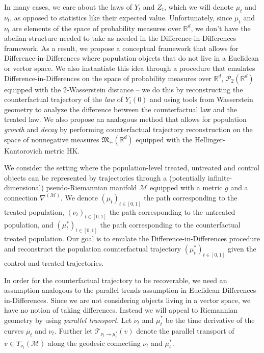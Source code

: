 \documentclass[11pt]{article}
\newcommand{\man}{\mathcal{M}}
\begin{document}
In many cases, we care about the laws of $Y_t$ and $Z_t$, which we will denote $\mu_t$ and $\nu_t$, as opposed to statistics like their expected value. Unfortunately, since $\mu_t$ and $\nu_t$ are elements of the space of probability measures over $\mathbb{R}^d$, we don't have the abelian structure needed to take  as needed in the Difference-in-Differences framework. As a result, we propose a conceptual framework that allows for Difference-in-Differences where population objects that do not live in a Euclidean or vector space. We also instantiate this idea through a procedure that emulates Difference-in-Differences on the space of probability measures over $\mathbb{R}^d$, $\mathcal{P}_2(\mathbb{R}^d)$ equipped with the 2-Wasserstein distance -- we do this by reconstructing the counterfactual trajectory of the \textit{law} of $Y_i(0)$ and using tools from Wasserstein geometry to analyze the difference between the counterfactual law and the treated law. We also propose an analogous method that allows for population \textit{growth} and \textit{decay} by performing counterfactual trajectory reconstruction on the space of nonnegative measures $\mathfrak{M}_+(\mathbb{R}^d)$ equipped with the Hellinger-Kantorovich metric HK. 

We consider the setting where the population-level treated, untreated and control objects can be represented by trajectories through a (potentially infinite-dimensional) pseudo-Riemannian manifold $\man$ equipped with a metric $g$ and a connection $\nabla^{(\man)}$. We denote $(\mu_t)_{t \in [0,1]}$ the path corresponding to the treated population, $(\nu_t)_{t\in [0,1]}$ the path corresponding to the untreated population, and $(\mu_t^*)_{t \in [0,1]}$ the path corresponding to the counterfactual treated population. Our goal is to emulate the Difference-in-Differences procedure and reconstruct the population counterfactual trajectory $(\mu_t^*)_{t \in [0,1]}$ given the control and treated trajectories. 

In order for the counterfactual trajectory to be recoverable, we need an assumption analogous to the parallel trends assumption in Euclidean Differences-in-Differences. Since we are not considering objects living in a vector space, we have no notion of taking differences. Instead we will appeal to Riemannian geometry by using \textit{parallel transport}. Let $\dot \nu_t$ and $\dot \mu_t^*$ be the time derivative of the curves $\mu_t$ and $\nu_t$. Further let $\mathcal{T}_{\nu_t \rightarrow \mu_t^*}(v)$ denote the parallel transport of $v \in T_{\nu_t}(\man)$ along the geodesic connecting $\nu_t$ and $\mu_t^*$.
\end{document}
